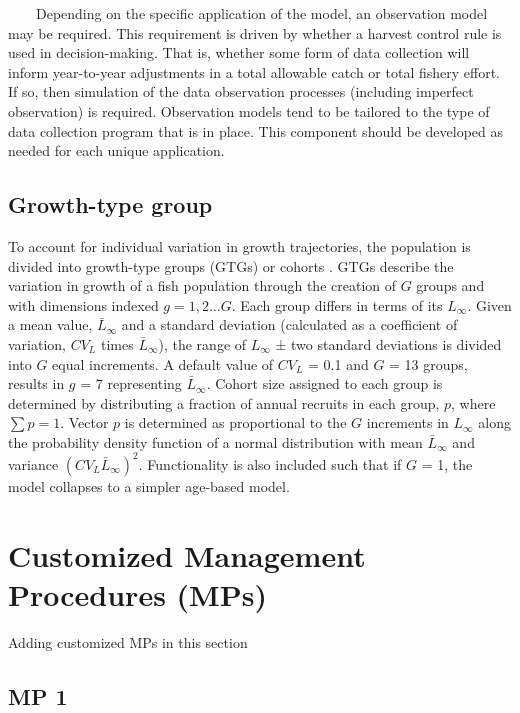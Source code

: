 \documentclass[
]{book}
\begin{document}
~~~~Depending on the specific application of the model, an observation model may be required. This requirement is driven by whether a harvest control rule is used in decision-making. That is, whether some form of data collection will inform year-to-year adjustments in a total allowable catch or total fishery effort. If so, then simulation of the data observation processes (including imperfect observation) is required. Observation models tend to be tailored to the type of data collection program that is in place. This component should be developed as needed for each unique application.

\section{Growth-type group}\label{growth-type-group}

To account for individual variation in growth trajectories, the population is divided into growth-type groups (GTGs) or cohorts \citep[\citet{pine_iii_curious_2015}, \citet{hordyk_simple_2016}]{walters_fisheries_2004}. GTGs describe the variation in growth of a fish population through the creation of \(G\) groups and with dimensions indexed \(g=1,2…G\). Each group differs in terms of its \(L_\infty\). Given a mean value, \(\bar{L}_\infty\) and a standard deviation (calculated as a coefficient of variation, \(CV_L\) times \(\bar{L}_\infty\)), the range of \(L_\infty\) ± two standard deviations is divided into \(G\) equal increments. A default value of \(CV_L\) = 0.1 and \(G\) = 13 groups, results in \(g\) = 7 representing \(\bar{L}_\infty\). Cohort size assigned to each group is determined by distributing a fraction of annual recruits in each group, \(p\), where \(\sum{p}=1\). Vector \(p\) is determined as proportional to the \(G\) increments in \(L_\infty\) along the probability density function of a normal distribution with mean \(\bar{L}_\infty\) and variance \(\left(CV_L{\bar{L}}_\infty\right)^2\). Functionality is also included such that if \(G\) = 1, the model collapses to a simpler age-based model.

\chapter{Customized Management Procedures (MPs)}\label{customized-management-procedures-mps}

Adding customized MPs in this section

\section{MP 1}\label{mp-1}
\end{document}
